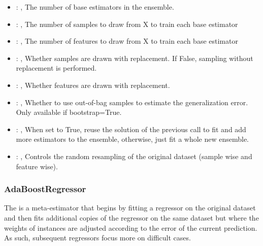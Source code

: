 \begin{itemize}
    \item {}: , 
      The number of base estimators in the ensemble.

    \item {}: , 
      The number of samples to draw from X to train each base estimator

    \item {}: , 
      The number of features to draw from X to train each base estimator

    \item {}: , 
      Whether samples are drawn with replacement. If False, sampling without
      replacement is performed.

    \item {}: , 
      Whether features are drawn with replacement.

    \item {}: , 
      Whether to use out-of-bag samples to estimate the generalization error.
      Only available if bootstrap=True.

    \item {}: , 
      When set to True, reuse the solution of the previous call to fit and add more
      estimators to the ensemble, otherwise, just fit a whole new ensemble.

    \item {}: , 
      Controls the random resampling of the original dataset (sample wise and feature wise).
  \end{itemize}


\subsubsection{AdaBoostRegressor}
  The  is a meta-estimator that begins by fitting a regressor on
  the original dataset and then fits additional copies of the regressor on the same dataset
  but where the weights of instances are adjusted according to the error of the current
  prediction. As such, subsequent regressors focus more on difficult cases.

